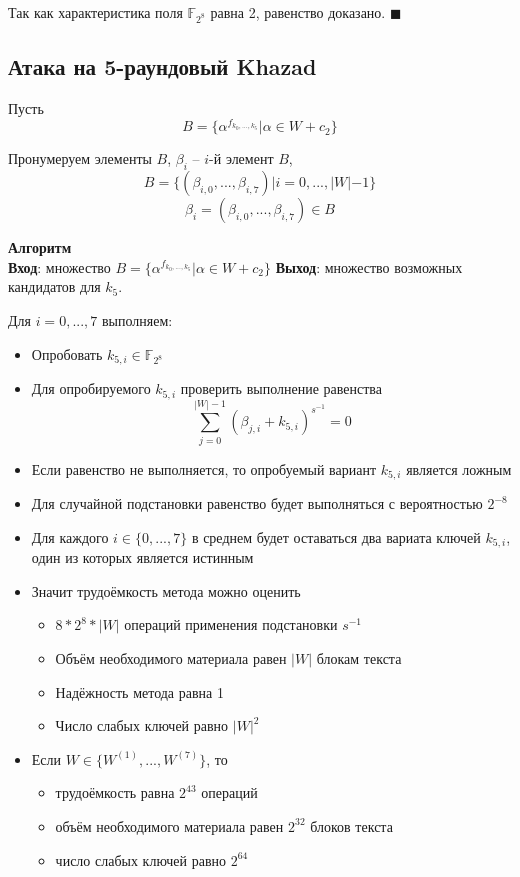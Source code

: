 \documentclass[a4paper,12pt]{article}
\begin{document}
  Так как характеристика поля $\mathbb{F}_{2^8}$ равна 2, равенство
  доказано. $\blacksquare$

  \subsection{Атака на 5-раундовый Khazad}
  Пусть \[ B = \{\alpha^{f_{k_0, ..., k_5}} | \alpha \in W + c_2 \} \]

  Пронумеруем элементы $B$, $\beta_i$ -- $i$-й элемент $B$,
  \[ B = \{(\beta_{i, 0}, ..., \beta_{i, 7}) | i = 0, ..., |W| - 1
    \} \]
  \[ \beta_i = (\beta_{i, 0}, ..., \beta_{i, 7}) \in B \]

  \textbf{Алгоритм}\\
  \textbf{Вход}: множество $B = \{\alpha^{f_{k_0, ..., k_5}} | \alpha
  \in W + c_2 \}$
  \textbf{Выход}: множество возможных кандидатов для $k_5$.

  Для $i = 0, ..., 7$ выполняем:
  \begin{itemize}
  \item Опробовать $k_{5, i} \in \mathbb{F}_{2^8}$
  \item Для опробируемого $k_{5, i}$ проверить выполнение равенства
    \[ \sum_{j = 0}^{|W| - 1}(\beta_{j, i} + k_{5, i})^{s^{-1}} = 0 \]
  \item Если равенство не выполняется, то опробуемый вариант $k_{5,
      i}$ является ложным
  \end{itemize}
  \begin{itemize}
  \item Для случайной подстановки равенство будет выполняться с
    вероятностью $2^{-8}$
  \item Для каждого $i \in \{0, ..., 7\}$ в среднем будет оставаться
    два вариата ключей $k_{5, i}$, один из которых является истинным
  \item Значит трудоёмкость метода можно оценить 
    \begin{itemize}
    \item $8 * 2^8 * |W|$ операций применения подстановки $s^{-1}$
    \item Объём необходимого материала равен $|W|$ блокам текста
    \item Надёжность метода равна 1
    \item Число слабых ключей равно $|W|^2$
    \end{itemize}
  \item Если $W \in \{W^{(1)}, ..., W^{(7)}\}$, то
    \begin{itemize}
    \item трудоёмкость равна $2^{43}$ операций
    \item объём необходимого материала равен $2^{32}$ блоков текста
    \item число слабых ключей равно $2^{64}$
    \end{itemize}
  \end{itemize}

  
\end{document}
